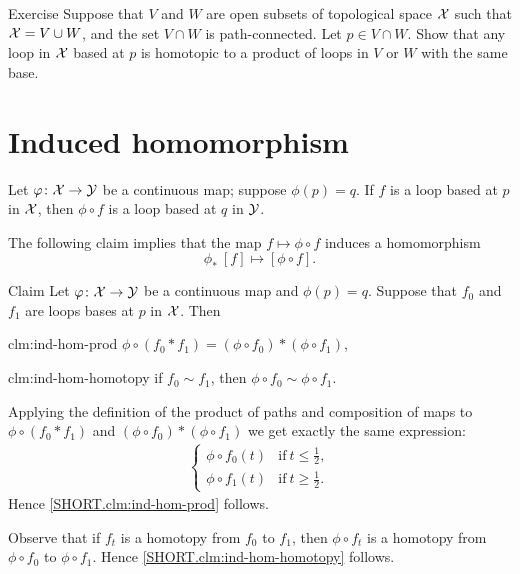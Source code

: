\begin{thm}{Exercise}
Suppose that $V$ and $W$ are open subsets of topological space $\mathcal{X}$ such that 
$\mathcal{X}=V\cup W$, and the set $V\cap W$ is path-connected.
Let $p\in V\cap W$.
Show that any loop in $\mathcal{X}$ based at $p$  is homotopic to a product of loops in $V$ or $W$ with the same base.
\end{thm}


\section{Induced homomorphism}

Let $\varphi\colon\mathcal{X}\to \mathcal{Y}$ be a continuous map;
suppose $\phi(p)=q$.
If $f$ is a loop based at $p$ in $\mathcal{X}$, then $\phi\circ f$ is a loop based at $q$ in $\mathcal{Y}$.

The following claim implies that the map $f\mapsto\phi\circ f$ induces a homomorphism
\[\phi_*\:[f]\mapsto [\phi\circ f].\]

\begin{thm}{Claim}\label{clm:ind-hom}
Let $\varphi\colon\mathcal{X}\to \mathcal{Y}$ be a continuous map and $\phi(p)=q$.
Suppose that $f_0$ and $f_1$ are loops bases at $p$ in $\mathcal{X}$.
Then

\begin{subthm}{clm:ind-hom-prod}
$\phi\circ(f_0*f_1)=(\phi\circ f_0)*(\phi\circ f_1)$,
\end{subthm}

\begin{subthm}{clm:ind-hom-homotopy}
if $f_0\sim f_1$, then $\phi\circ f_0\sim\phi\circ f_1$.
\end{subthm}

\end{thm}

Applying the definition of the product of paths and composition of maps to $\phi\circ(f_0*f_1)$ and $(\phi\circ f_0)*(\phi\circ f_1)$ we get exactly the same expression:
\begin{align*}
\begin{cases}
\phi\circ f_0(t)&\text{if}\ t\le \tfrac12,
\\
\phi\circ f_1(t)&\text{if}\ t\ge \tfrac12.
\end{cases}
\end{align*}
Hence \ref{SHORT.clm:ind-hom-prod} follows.

Observe that if $f_t$ is a homotopy from $f_0$ to $f_1$, then $\phi\circ f_t$ is a homotopy from $\phi\circ f_0$ to $\phi\circ f_1$.
Hence \ref{SHORT.clm:ind-hom-homotopy} follows.
\qeds



